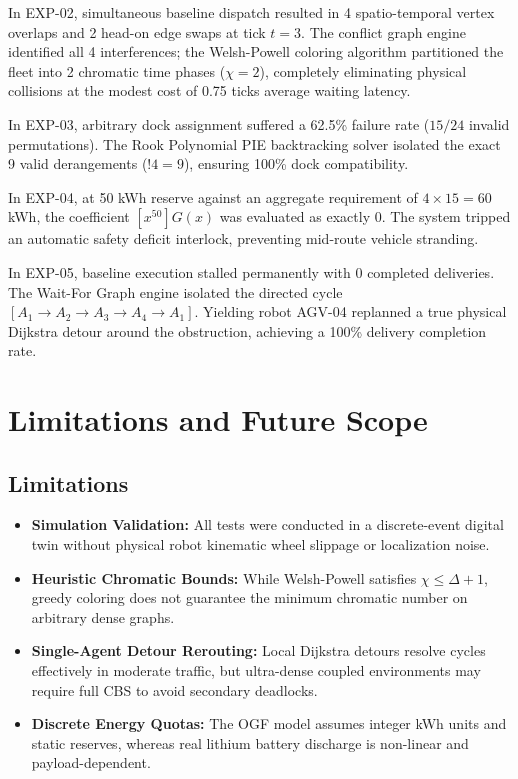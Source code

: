 \documentclass[conference]{IEEEtran}
\begin{document}
In EXP-02, simultaneous baseline dispatch resulted in 4 spatio-temporal vertex overlaps and 2 head-on edge swaps at tick $t=3$. The conflict graph engine identified all 4 interferences; the Welsh-Powell coloring algorithm partitioned the fleet into 2 chromatic time phases ($\chi = 2$), completely eliminating physical collisions at the modest cost of 0.75 ticks average waiting latency.

In EXP-03, arbitrary dock assignment suffered a 62.5\% failure rate ($15/24$ invalid permutations). The Rook Polynomial PIE backtracking solver isolated the exact 9 valid derangements ($!4 = 9$), ensuring 100\% dock compatibility.

In EXP-04, at 50 kWh reserve against an aggregate requirement of $4 \times 15 = 60$ kWh, the coefficient $[x^{50}] G(x)$ was evaluated as exactly 0. The system tripped an automatic safety deficit interlock, preventing mid-route vehicle stranding.

In EXP-05, baseline execution stalled permanently with 0 completed deliveries. The Wait-For Graph engine isolated the directed cycle $[A_1 \to A_2 \to A_3 \to A_4 \to A_1]$. Yielding robot AGV-04 replanned a true physical Dijkstra detour around the obstruction, achieving a 100\% delivery completion rate.

\section{Limitations and Future Scope}
\subsection{Limitations}
\begin{itemize}
    \item \textbf{Simulation Validation:} All tests were conducted in a discrete-event digital twin without physical robot kinematic wheel slippage or localization noise.
    \item \textbf{Heuristic Chromatic Bounds:} While Welsh-Powell satisfies $\chi \le \Delta + 1$, greedy coloring does not guarantee the minimum chromatic number on arbitrary dense graphs.
    \item \textbf{Single-Agent Detour Rerouting:} Local Dijkstra detours resolve cycles effectively in moderate traffic, but ultra-dense coupled environments may require full CBS to avoid secondary deadlocks.
    \item \textbf{Discrete Energy Quotas:} The OGF model assumes integer kWh units and static reserves, whereas real lithium battery discharge is non-linear and payload-dependent.
\end{itemize}
\end{document}

